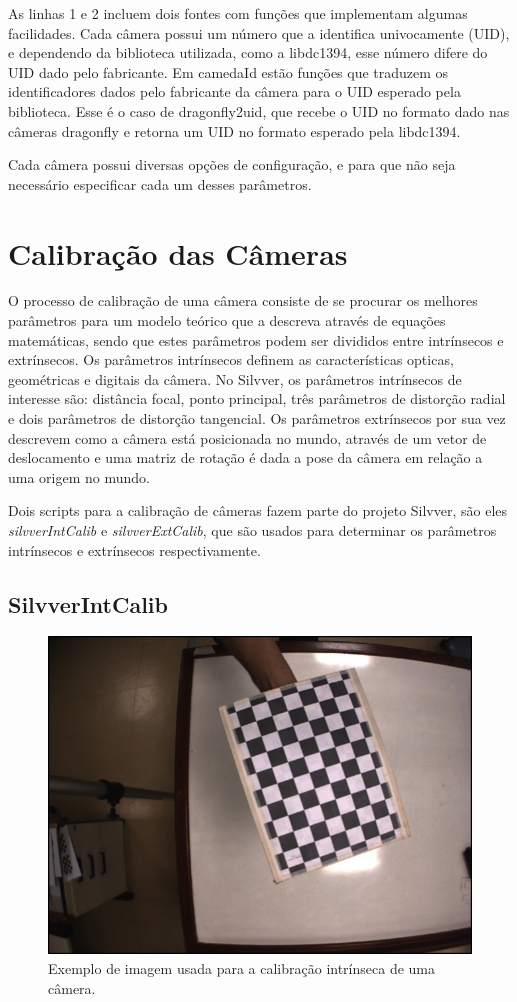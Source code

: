 \documentclass[a4paper,10pt]{article}
\begin{document}
As linhas 1 e 2 incluem dois fontes com funções que implementam algumas
facilidades. Cada câmera possui um número que a identifica univocamente (UID),
e dependendo da biblioteca utilizada, como a libdc1394, esse número difere do
UID dado pelo fabricante. Em camedaId estão funções que traduzem os
identificadores dados pelo fabricante da câmera para o UID esperado pela
biblioteca. Esse é o caso de dragonfly2uid, que recebe o UID no formato dado
nas câmeras dragonfly e retorna um UID no formato esperado pela libdc1394.

Cada câmera possui diversas opções de configuração, e para que não seja
necessário especificar cada um desses parâmetros.

\section{Calibração das Câmeras}

O processo de calibração de uma câmera consiste de se procurar os melhores
parâmetros para um modelo teórico que a descreva através de equações
matemáticas, sendo que estes parâmetros podem ser divididos entre intrínsecos
e extrínsecos. Os parâmetros intrínsecos definem as características opticas,
geométricas e digitais da câmera. No Silvver, os parâmetros intrínsecos de
interesse são: distância focal, ponto principal, três parâmetros de distorção
radial e dois parâmetros de distorção tangencial. Os parâmetros extrínsecos
por sua vez descrevem como a câmera está posicionada no mundo, através de um
vetor de deslocamento e uma matriz de rotação é dada a pose da câmera em
relação a uma origem no mundo.

Dois scripts para a calibração de câmeras fazem parte do projeto Silvver, são
eles \emph{silvverIntCalib} e \emph{silvverExtCalib}, que são usados para
determinar os parâmetros intrínsecos e extrínsecos respectivamente.

\subsection{SilvverIntCalib}

\begin{figure}
  \centering
  \includegraphics[width=0.5\columnwidth]{figures/checkerboard}
  \caption{Exemplo de imagem usada para a calibração intrínseca de uma
    câmera.}
  \label{fig:checkerboard}
\end{figure}
\end{document}
